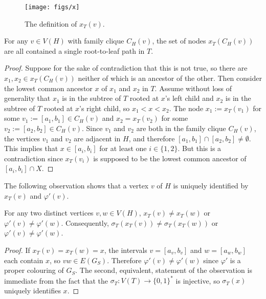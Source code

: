 \documentclass[kpfonts]{patmorin}
\begin{document}
\begin{figure}
  \begin{center}
    \texttt{[image: figs/x]}
  \end{center}
  \caption{The definition of $x_T(v)$.}
\end{figure}

\begin{lem}
  For any $v\in V(H)$ with family clique $C_H(v)$, the set of nodes $x_T(C_H(v))$ are all contained a single root-to-leaf path in $T$.
\end{lem}

\begin{proof}
  Suppose for the sake of contradiction that this is not true, so there are $x_1,x_2\in x_T(C_H(v))$ neither of which is an ancestor of the other.  Then consider the lowest common ancestor $x$ of $x_1$ and $x_2$ in $T$.  Assume without loss of generality that $x_1$ is in the subtree of $T$ rooted at $x$'s left child and $x_2$ is in the subtree of $T$ rooted at $x$'s right child, so $x_1<x<x_2$. The node $x_1:=x_T(v_1)$ for some $v_1:=[a_1,b_1]\in C_H(v)$ and $x_2=x_T(v_2)$ for some $v_2:=[a_2,b_2]\in C_H(v)$.  Since $v_1$ and $v_2$ are both in the family clique $C_H(v)$, the vertices $v_1$ and $v_2$ are adjacent in $H$, and therefore $[a_1,b_1]\cap[a_2,b_2]\neq\emptyset$.  This implies that $x\in [a_i,b_i]$ for at least one $i\in\{1,2\}$.  But this is a contradiction since $x_T(v_i)$ is supposed to be the lowest common ancestor of $[a_i,b_i]\cap X$.
\end{proof}

The following observation shows that a vertex $v$ of $H$ is uniquely identified by $x_T(v)$ and $\varphi'(v)$.

\begin{obs}
    For any two distinct vertices $v,w\in V(H)$, $x_T(v)\neq x_T(w)$ or $\varphi'(v)\neq\varphi'(w)$.  Consequently, $\sigma_T(x_T(v))\neq \sigma_T(x_T(w))$ or $\varphi'(v)\neq\varphi'(w)$. 
\end{obs}

\begin{proof}
  If $x_T(v)=x_T(w)=x$, the intervals $v=[a_v,b_v]$ and $w=[a_w,b_w]$ each contain $x$, so $vw\in E(G_S)$.  Therefore $\varphi'(v)\neq\varphi'(w)$ since $\varphi'$ is a proper colouring of $G_S$.  The second, equivalent, statement of the observation is immediate from the fact that the $\sigma_T: V(T)\to\{0,1\}^*$ is injective, so $\sigma_T(x)$ uniquely identifies $x$.
\end{proof}
\end{document}
